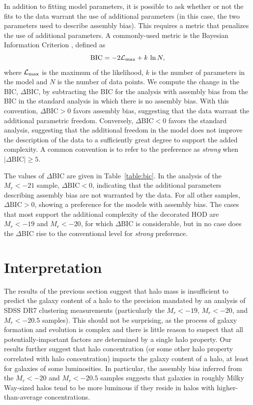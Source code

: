 \documentclass[usenatbib,usegraphicx,letterpaper]{mn2e}
\newcommand{\magr}{M_r}
\begin{document}
In addition to fitting model parameters, it is possible to ask whether or not the fits to the data warrant the use of 
additional parameters (in this case, the two parameters used to describe assembly bias). This requires a 
metric that penalizes the use of additional parameters. A commonly-used metric is the 
Bayesian Information Criterion 
\citep[BIC,][]{schwarz78}, defined as 
%
\begin{equation}
\mathrm{BIC} = -2 \mathcal{L}_{\rm max} + k\, \ln N, 
\end{equation}
%
where $\mathcal{L}_{\rm max}$ is the maximum of the likelihood, 
$k$ is the number of parameters in the model and $N$ is the number of 
data points. We compute the change in the BIC, $\Delta$BIC, by subtracting 
the BIC for the analysis with assembly bias from the BIC in the standard analysis 
in which there is no assembly bias. With this convention, $\Delta \mathrm{BIC} > 0$ 
favors assembly bias, suggesting that the data warrant the additional parametric freedom. 
Conversely, $\Delta \mathrm{BIC} < 0$ favors the standard analysis, 
suggesting that the additional freedom in the model does not improve the description of the data 
to a sufficiently great degree to support the added complexity. 
A common convention is to refer to the preference as 
{\em strong} when $\vert \Delta \mathrm{BIC}\vert \ge 5$. 

The values of $\Delta$BIC are given in Table~\ref{table:bic}. In the analysis of the $\magr < -21$ sample, 
$\Delta \mathrm{BIC} < 0$, indicating that the additional parameters describing assembly bias are not 
warranted by the data. For all other samples, $\Delta \mathrm{BIC} > 0$, showing a preference for 
the models with assembly bias. The cases that most support the additional complexity 
of the decorated HOD are $\magr < -19$ and $\magr < -20$, for which $\Delta$BIC is 
considerable, but in no case does the $\Delta$BIC rise to the conventional level for {\em strong} 
preference.

\section{Interpretation}
\label{section:discussion}

The results of the previous section suggest that halo
mass is insufficient to predict the galaxy content of a halo to the
precision mandated by an analysis of SDSS DR7 clustering measurements
(particularly the $\magr < -19$, $\magr < -20$, and $\magr < -20.5$
samples).  This should not be surprising, as the process of galaxy
formation and evolution is complex and there is little reason to
suspect that all potentially-important factors are determined by a
single halo property. Our results further suggest that halo
concentration (or some other halo property correlated with halo
concentration) impacts the galaxy content of a halo, at least for
galaxies of some luminosities. In particular, the assembly bias
inferred from the $\magr < -20$ and $\magr < -20.5$ samples suggests
that galaxies in roughly Milky Way-sized halos tend to be more
luminous if they reside in halos with higher-than-average
concentrations.
\end{document}
